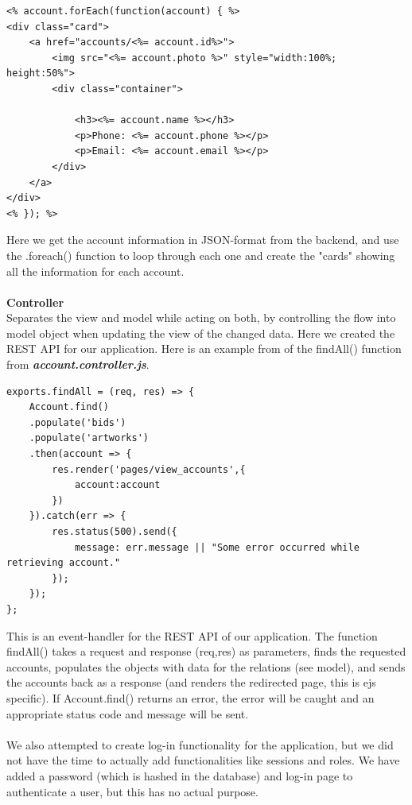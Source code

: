 \begin{verbatim}
<% account.forEach(function(account) { %>
<div class="card">
    <a href="accounts/<%= account.id%>">
        <img src="<%= account.photo %>" style="width:100%; height:50%">
        <div class="container">
        
            <h3><%= account.name %></h3>
            <p>Phone: <%= account.phone %></p>
            <p>Email: <%= account.email %></p>
        </div>
    </a>
</div>
<% }); %>
\end{verbatim}
Here we get the account information in JSON-format from the backend, and use the .foreach() function to loop through each one and create the "cards" showing all the information for each account.
\\\\
\textbf{Controller}
\\
Separates the view and model while acting on both, by controlling the flow into model object when updating the view of the changed data. Here we created the REST API for our application. Here is an example from of the findAll() function from \textbf{\textit{account.controller.js}}.

\begin{verbatim}
exports.findAll = (req, res) => {
    Account.find()
    .populate('bids')
    .populate('artworks')
    .then(account => {
        res.render('pages/view_accounts',{
            account:account
        })
    }).catch(err => {
        res.status(500).send({
            message: err.message || "Some error occurred while retrieving account."
        });
    });
};
\end{verbatim}
This is an event-handler for the REST API of our application. The function findAll() takes a request and response (req,res) as parameters, finds the requested accounts, populates the objects with data for the relations (see model), and sends the accounts back as a response (and renders the redirected page, this is ejs specific). If Account.find() returns an error, the error will be caught and an appropriate status code and message will be sent.
\\\\
We also attempted to create log-in functionality for the application, but we did not have the time to actually add functionalities like sessions and roles. We have added a password (which is hashed in the database) and log-in page to authenticate a user, but this has no actual purpose. 

